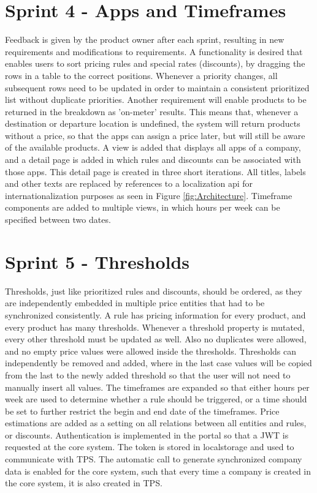 %
\section{Sprint 4 - Apps and Timeframes}
Feedback is given by the product owner after each sprint, resulting in new requirements and modifications to requirements. A functionality is desired that enables users to sort pricing rules and special rates (discounts), by dragging the rows in a table to the correct positions. Whenever a priority changes, all subsequent rows need to be updated in order to maintain a consistent prioritized list without duplicate priorities. Another requirement will enable products to be returned in the breakdown as 'on-meter' results. This means that, whenever a destination or departure location is undefined, the system will return products without a price, so that the apps can assign a price later, but will still be aware of the available products. A view is added that displays all apps of a company, and a detail page is added in which rules and discounts can be associated with those apps. This detail page is created in three short iterations. All titles, labels and other texts are replaced by references to a localization api for internationalization purposes as seen in Figure \ref{fig:Architecture}. Timeframe components are added to multiple views, in which hours per week can be specified between two dates.

%
\section{Sprint 5 - Thresholds}
Thresholds, just like prioritized rules and discounts, should be ordered, as they are independently embedded in multiple price entities that had to be synchronized consistently. A rule has pricing information for every product, and every product has many thresholds. Whenever a threshold property is mutated, every other threshold must be updated as well. Also no duplicates were allowed, and no empty price values were allowed inside the thresholds. Thresholds can independently be removed and added, where in the last case values will be copied from the last to the newly added threshold so that the user will not need to manually insert all values. The timeframes are expanded so that either hours per week are used to determine whether a rule should be triggered, or a time should be set to further restrict the begin and end date of the timeframes. Price estimations are added as a setting on all relations between all entities and rules, or discounts. Authentication is implemented in the portal so that a JWT is requested at the core system. The token is stored in localstorage and used to communicate with TPS. The automatic call to generate synchronized company data is enabled for the core system, such that every time a company is created in the core system, it is also created in TPS.

